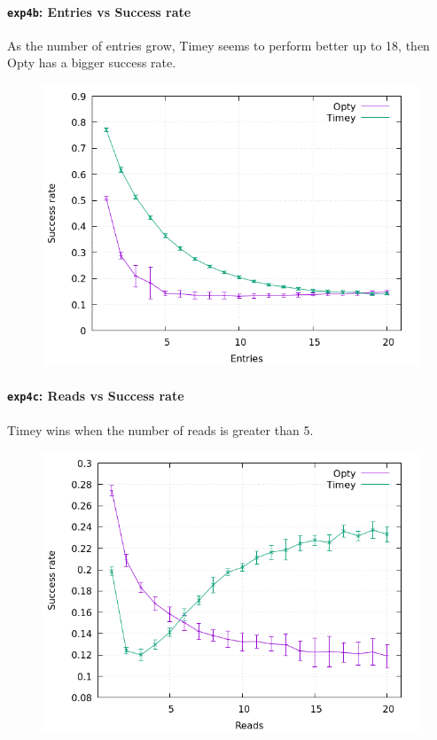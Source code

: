 \documentclass[a4paper, 11pt]{article}
\begin{document}
\paragraph{\texttt{exp4b}: Entries vs Success rate}

As the number of entries grow, Timey seems to perform better up to 18, then Opty 
has a bigger success rate.
\nopagebreak
\begin{figure}[H]
\centering
\includegraphics[width=.8\linewidth]{exp4/b/fig.png}
\end{figure}

\paragraph{\texttt{exp4c}: Reads vs Success rate}

Timey wins when the number of reads is greater than 5.

\nopagebreak
\begin{figure}[H]
\centering
\includegraphics[width=.8\linewidth]{exp4/c/fig.png}
\end{figure}
\end{document}

